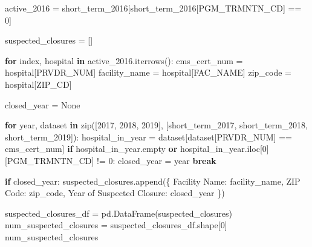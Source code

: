 \documentclass[
  letterpaper,
  DIV=11,
  numbers=noendperiod]{scrartcl}
\newenvironment{Shaded}{\begin{snugshade}}{\end{snugshade}}
\newcommand{\BuiltInTok}[1]{\textcolor[rgb]{0.00,0.23,0.31}{#1}}
\newcommand{\ControlFlowTok}[1]{\textcolor[rgb]{0.00,0.23,0.31}{\textbf{#1}}}
\newcommand{\DecValTok}[1]{\textcolor[rgb]{0.68,0.00,0.00}{#1}}
\newcommand{\KeywordTok}[1]{\textcolor[rgb]{0.00,0.23,0.31}{\textbf{#1}}}
\newcommand{\NormalTok}[1]{\textcolor[rgb]{0.00,0.23,0.31}{#1}}
\newcommand{\OperatorTok}[1]{\textcolor[rgb]{0.37,0.37,0.37}{#1}}
\newcommand{\StringTok}[1]{\textcolor[rgb]{0.13,0.47,0.30}{#1}}
\newcommand{\VariableTok}[1]{\textcolor[rgb]{0.07,0.07,0.07}{#1}}
\begin{document}
\begin{Shaded}
\begin{Highlighting}[]
\NormalTok{active\_2016 }\OperatorTok{=}\NormalTok{ short\_term\_2016[short\_term\_2016[}\StringTok{\textquotesingle{}PGM\_TRMNTN\_CD\textquotesingle{}}\NormalTok{] }\OperatorTok{==} \DecValTok{0}\NormalTok{]}

\NormalTok{suspected\_closures }\OperatorTok{=}\NormalTok{ []}

\ControlFlowTok{for}\NormalTok{ index, hospital }\KeywordTok{in}\NormalTok{ active\_2016.iterrows():}
\NormalTok{    cms\_cert\_num }\OperatorTok{=}\NormalTok{ hospital[}\StringTok{\textquotesingle{}PRVDR\_NUM\textquotesingle{}}\NormalTok{]}
\NormalTok{    facility\_name }\OperatorTok{=}\NormalTok{ hospital[}\StringTok{\textquotesingle{}FAC\_NAME\textquotesingle{}}\NormalTok{]}
\NormalTok{    zip\_code }\OperatorTok{=}\NormalTok{ hospital[}\StringTok{\textquotesingle{}ZIP\_CD\textquotesingle{}}\NormalTok{]}

\NormalTok{    closed\_year }\OperatorTok{=} \VariableTok{None}

    \ControlFlowTok{for}\NormalTok{ year, dataset }\KeywordTok{in} \BuiltInTok{zip}\NormalTok{([}\DecValTok{2017}\NormalTok{, }\DecValTok{2018}\NormalTok{, }\DecValTok{2019}\NormalTok{], [short\_term\_2017, short\_term\_2018, short\_term\_2019]):}
\NormalTok{        hospital\_in\_year }\OperatorTok{=}\NormalTok{ dataset[dataset[}\StringTok{\textquotesingle{}PRVDR\_NUM\textquotesingle{}}\NormalTok{] }\OperatorTok{==}\NormalTok{ cms\_cert\_num]}
        \ControlFlowTok{if}\NormalTok{ hospital\_in\_year.empty }\KeywordTok{or}\NormalTok{ hospital\_in\_year.iloc[}\DecValTok{0}\NormalTok{][}\StringTok{\textquotesingle{}PGM\_TRMNTN\_CD\textquotesingle{}}\NormalTok{] }\OperatorTok{!=} \DecValTok{0}\NormalTok{:}
\NormalTok{            closed\_year }\OperatorTok{=}\NormalTok{ year}
            \ControlFlowTok{break}

    \ControlFlowTok{if}\NormalTok{ closed\_year:}
\NormalTok{        suspected\_closures.append(\{}
            \StringTok{\textquotesingle{}Facility Name\textquotesingle{}}\NormalTok{: facility\_name,}
            \StringTok{\textquotesingle{}ZIP Code\textquotesingle{}}\NormalTok{: zip\_code,}
            \StringTok{\textquotesingle{}Year of Suspected Closure\textquotesingle{}}\NormalTok{: closed\_year}
\NormalTok{        \})}

\NormalTok{suspected\_closures\_df }\OperatorTok{=}\NormalTok{ pd.DataFrame(suspected\_closures)}
\NormalTok{num\_suspected\_closures }\OperatorTok{=}\NormalTok{ suspected\_closures\_df.shape[}\DecValTok{0}\NormalTok{]}
\NormalTok{num\_suspected\_closures}
\end{Highlighting}
\end{Shaded}
\end{document}
